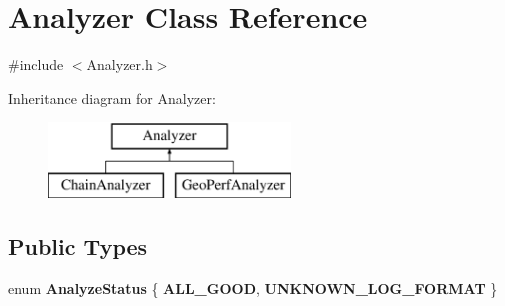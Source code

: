 \hypertarget{class_analyzer}{}\section{Analyzer Class Reference}
\label{class_analyzer}


{\ttfamily \#include $<$Analyzer.\+h$>$}

Inheritance diagram for Analyzer\+:\begin{figure}[H]
\begin{center}
\leavevmode
\includegraphics[height=2.000000cm]{class_analyzer}
\end{center}
\end{figure}
\subsection*{Public Types}
\begin{DoxyCompactItemize}
\item 
\mbox{\label{class_analyzer_ab7e9cc7fdf79f6d9d40130dcb7a6c2e9}} 
enum {\bfseries Analyze\+Status} \{ {\bfseries A\+L\+L\+\_\+\+G\+O\+OD}, 
{\bfseries U\+N\+K\+N\+O\+W\+N\+\_\+\+L\+O\+G\+\_\+\+F\+O\+R\+M\+AT}
 \}
\end{DoxyCompactItemize}
